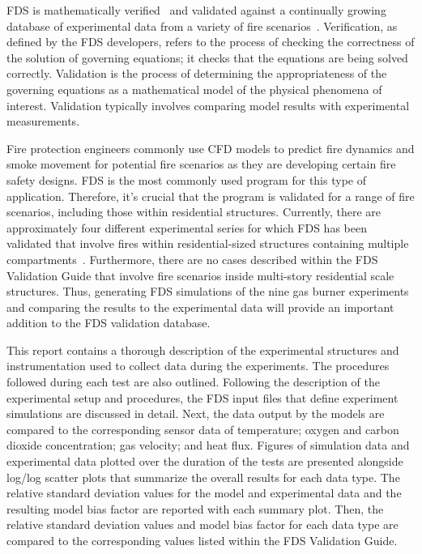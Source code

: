 FDS is mathematically verified~\cite{FDS_Verification_Guide} and validated against a continually growing database of experimental data from a variety of fire scenarios~\cite{FDS_Validation_Guide}. Verification, as defined by the FDS developers, refers to the process of checking the correctness of the solution of governing equations; it checks that the equations are being solved correctly. Validation is the process of determining the appropriateness of the governing equations as a mathematical model of the physical phenomena of interest. Validation typically involves comparing model results with experimental measurements.   

Fire protection engineers commonly use CFD models to predict fire dynamics and smoke movement for potential fire scenarios as they are developing certain fire safety designs. FDS is the most commonly used program for this type of application. Therefore, it's crucial that the program is validated for a range of fire scenarios, including those within residential structures. Currently, there are approximately four different experimental series for which FDS has been validated that involve fires within residential-sized structures containing multiple compartments~\cite{FDS_Validation_Guide}. Furthermore, there are no cases described within the FDS Validation Guide that involve fire scenarios inside multi-story residential scale structures. Thus, generating FDS simulations of the nine gas burner experiments and comparing the results to the experimental data will provide an important addition to the FDS validation database.

This report contains a thorough description of the experimental structures and instrumentation used to collect data during the experiments. The procedures followed during each test are also outlined. Following the description of the experimental setup and procedures, the FDS input files that define experiment simulations are discussed in detail. Next, the data output by the models are compared to the corresponding sensor data of temperature; oxygen and carbon dioxide concentration; gas velocity; and heat flux. Figures of simulation data and experimental data plotted over the duration of the tests are presented alongside log/log scatter plots that summarize the overall results for each data type. The relative standard deviation values for the model and experimental data and the resulting model bias factor are reported with each summary plot. Then, the relative standard deviation values and model bias factor for each data type are compared to the corresponding values listed within the FDS Validation Guide. 